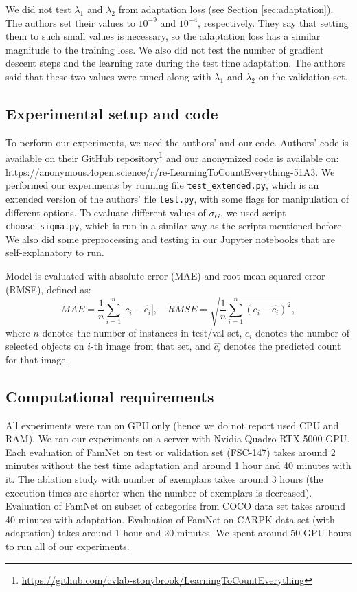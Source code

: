 We did not test $\lambda_1$ and $\lambda_2$ from adaptation loss (see Section \ref{sec:adaptation}). The authors set their values to $10^{-9}$ and $10^{-4}$, respectively. They say that setting them to such small values is necessary, so the adaptation loss has a similar magnitude to the training loss. We also did not test the number of gradient descent steps and the learning rate during the test time adaptation. The authors said that these two values were tuned along with $\lambda_1$ and $\lambda_2$ on the validation set.

\subsection{Experimental setup and code}
To perform our experiments, we used the authors' and our code. Authors' code is available on their GitHub repository\footnote{\url{https://github.com/cvlab-stonybrook/LearningToCountEverything}} and our anonymized code is available on: \url{https://anonymous.4open.science/r/re-LearningToCountEverything-51A3}. We performed our experiments by running file \texttt{test\_extended.py}, which is an extended version of the authors' file \texttt{test.py}, with some flags for manipulation of different options. To evaluate different values of $\sigma_G$, we used script \texttt{choose\_sigma.py}, which is run in a similar way as the scripts mentioned before. We also did some preprocessing and testing in our Jupyter notebooks that are self-explanatory to run.

Model is evaluated with absolute error (MAE) and root mean squared error (RMSE), defined as:
\begin{equation}
MAE = \frac{1}{n}\sum_{i=1}^n|c_i - \hat{c_i}|, \quad RMSE = \sqrt{\frac{1}{n}\sum_{i=1}^n (c_i - \hat{c_i})^2},
\end{equation}
where $n$ denotes the number of instances in test/val set, $c_i$ denotes the number of selected objects on $i$-th image from that set, and $\hat{c_i}$ denotes the predicted count for that image.

\subsection{Computational requirements}

All experiments were ran on GPU only (hence we do not report used CPU and RAM). We ran our experiments on a server with Nvidia Quadro RTX 5000 GPU. Each evaluation of FamNet on test or validation set (FSC-147) takes around 2 minutes without the test time adaptation and around 1 hour and 40 minutes with it. The ablation study with number of exemplars takes around 3 hours (the execution times are shorter when the number of exemplars is decreased). Evaluation of FamNet on subset of categories from COCO data set takes around 40 minutes with adaptation. Evaluation of FamNet on CARPK data set (with adaptation) takes around 1 hour and 20 minutes. We spent around 50 GPU hours to run all of our experiments.


